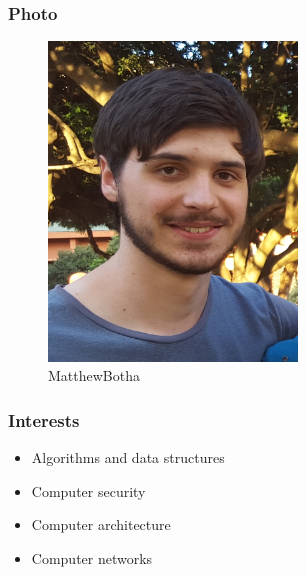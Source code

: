 \documentclass{article}
\begin{document}
		\subsubsection{Photo}
		\begin{figure}[H]
			\centering
			\includegraphics[width=250px]{../Matt.jpg}
			\caption{MatthewBotha}
		\end{figure}
		\subsubsection{Interests}
		\begin{itemize}
			\item Algorithms and data structures
			\item Computer security
			\item Computer architecture
			\item Computer networks
		\end{itemize}
\end{document}
